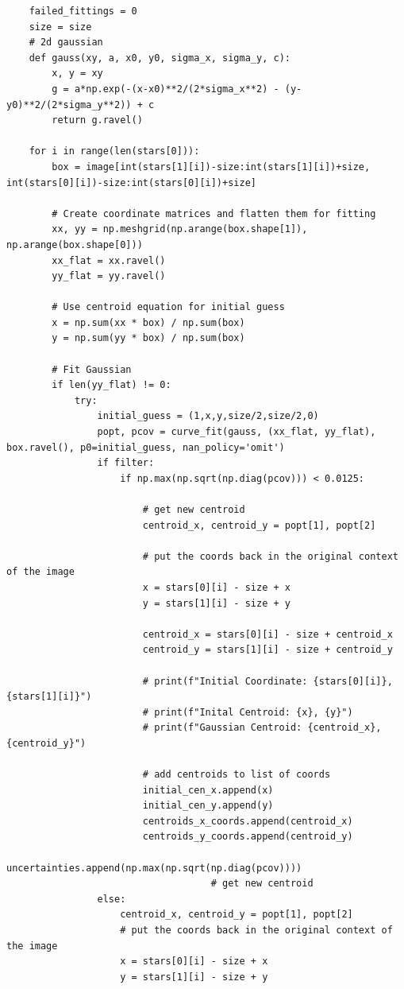 \documentclass{article}
\begin{document}
\begin{appendices}
\begin{small}
\begin{verbatim}
    failed_fittings = 0
    size = size
    # 2d gaussian
    def gauss(xy, a, x0, y0, sigma_x, sigma_y, c):
        x, y = xy
        g = a*np.exp(-(x-x0)**2/(2*sigma_x**2) - (y-y0)**2/(2*sigma_y**2)) + c
        return g.ravel()

    for i in range(len(stars[0])):
        box = image[int(stars[1][i])-size:int(stars[1][i])+size, int(stars[0][i])-size:int(stars[0][i])+size]
        
        # Create coordinate matrices and flatten them for fitting
        xx, yy = np.meshgrid(np.arange(box.shape[1]), np.arange(box.shape[0])) 
        xx_flat = xx.ravel()
        yy_flat = yy.ravel()

        # Use centroid equation for initial guess
        x = np.sum(xx * box) / np.sum(box) 
        y = np.sum(yy * box) / np.sum(box) 

        # Fit Gaussian
        if len(yy_flat) != 0:            
            try:
                initial_guess = (1,x,y,size/2,size/2,0)
                popt, pcov = curve_fit(gauss, (xx_flat, yy_flat), box.ravel(), p0=initial_guess, nan_policy='omit')
                if filter:
                    if np.max(np.sqrt(np.diag(pcov))) < 0.0125:
                            
                        # get new centroid
                        centroid_x, centroid_y = popt[1], popt[2]
                        
                        # put the coords back in the original context of the image
                        x = stars[0][i] - size + x
                        y = stars[1][i] - size + y
                        
                        centroid_x = stars[0][i] - size + centroid_x
                        centroid_y = stars[1][i] - size + centroid_y
                        
                        # print(f"Initial Coordinate: {stars[0][i]}, {stars[1][i]}")
                        # print(f"Inital Centroid: {x}, {y}")
                        # print(f"Gaussian Centroid: {centroid_x}, {centroid_y}")
                        
                        # add centroids to list of coords
                        initial_cen_x.append(x)
                        initial_cen_y.append(y)
                        centroids_x_coords.append(centroid_x)
                        centroids_y_coords.append(centroid_y)
                        uncertainties.append(np.max(np.sqrt(np.diag(pcov))))
                                    # get new centroid
                else:
                    centroid_x, centroid_y = popt[1], popt[2]
                    # put the coords back in the original context of the image
                    x = stars[0][i] - size + x
                    y = stars[1][i] - size + y
                    

\end{verbatim}
\end{small}
\end{appendices}
\end{document}
